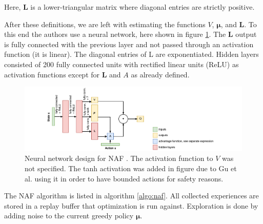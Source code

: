 Here, $\mathbf{L}$ is a lower-triangular matrix where diagonal entries are
strictly positive.

After these definitions, we are left with estimating the functions $V$,
$\mathbf{\mu}$, and $\mathbf{L}$. To this end the authors use a neural network,
here shown in figure \ref{fig:naf-net}. The $\mathbf{L}$ output is fully
connected with the previous layer and not passed through an activation function
(it is linear). The diagonal entries of L are exponentiated. Hidden layers
consisted of 200 fully connected units with rectified linear units (ReLU) as
activation functions except for $\mathbf{L}$ and $A$ as already defined.

\begin{figure}[h]
    \centering
    \includegraphics[width=1.0\textwidth]{res/naf-net.pdf}

    \caption{Neural network design for NAF \cite{gu2016continuous}. The
    activation function to $V$ was not specified. The tanh activation was added
    in figure due to Gu et al. \cite{gu2016deep} using it in order to have
    bounded actions for safety reasons.}

    \label{fig:naf-net}
\end{figure}

The NAF algorithm is listed in algorithm \ref{algo:naf}. All collected experiences
are stored in a replay buffer that optimization is run against. Exploration is done
by adding noise to the current greedy policy $\mathbf{\mu}$.

